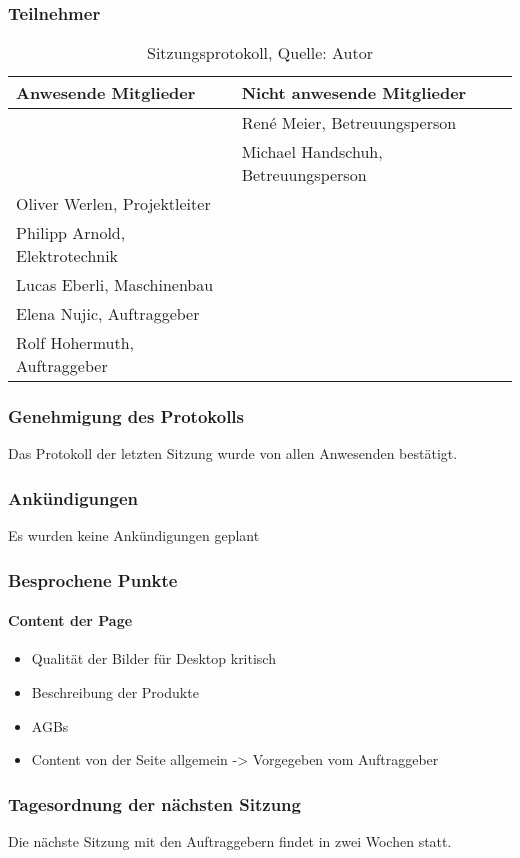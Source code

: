 \subsubsection{Teilnehmer}
\begin{table}[H]
	\setlength\extrarowheight{2pt} %
	\begin{tabularx}{\textwidth}{|X|X|}
		\hline
		\textbf{Anwesende Mitglieder} &  \textbf{Nicht anwesende Mitglieder} \\
		\hline
		& René Meier, Betreuungsperson  \\
		& Michael Handschuh, Betreuungsperson   \\
		Oliver Werlen, Projektleiter &  \\
		Philipp Arnold, Elektrotechnik & \\
		Lucas Eberli, Maschinenbau & \\
		Elena Nujic, Auftraggeber & \\
		Rolf Hohermuth, Auftraggeber & \\
		\hline
	\end{tabularx}
	\caption{ \label{tbl: Teilnehmerliste vom 01.04.2021}Sitzungsprotokoll, Quelle: Autor}
\end{table}
\subsubsection{Genehmigung des Protokolls}
Das Protokoll der letzten Sitzung wurde von allen Anwesenden bestätigt.
\subsubsection{Ankündigungen}
Es wurden keine Ankündigungen geplant
\subsubsection{Besprochene Punkte}
\paragraph{Content der Page}
\begin{itemize}
	\item Qualität der Bilder für Desktop kritisch
	\item Beschreibung der Produkte
	\item AGBs
	\item Content von der Seite allgemein -> Vorgegeben vom Auftraggeber
\end{itemize}
\subsubsection{Tagesordnung der nächsten Sitzung}
Die nächste Sitzung mit den Auftraggebern findet in zwei Wochen statt. 
